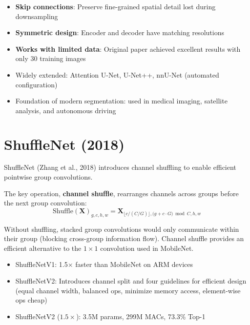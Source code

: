 \begin{properties}
\begin{itemize}
    \item \textbf{Skip connections}: Preserve fine-grained spatial detail lost during downsampling
    \item \textbf{Symmetric design}: Encoder and decoder have matching resolutions
    \item \textbf{Works with limited data}: Original paper achieved excellent results with only 30 training images
    \item Widely extended: Attention U-Net, U-Net++, nnU-Net (automated configuration)
    \item Foundation of modern segmentation: used in medical imaging, satellite analysis, and autonomous driving
\end{itemize}
\end{properties}

\section{ShuffleNet (2018)}

ShuffleNet (Zhang et al., 2018) introduces channel shuffling to enable efficient pointwise group convolutions.

The key operation, \textbf{channel shuffle}, rearranges channels across groups before the next group convolution:
\begin{equation}
\text{Shuffle}(\mathbf{X})_{g, c, h, w} = \mathbf{X}_{\lfloor c / (C/G) \rfloor, \bigl(g + c \cdot G \bigr) \bmod C, h, w}
\end{equation}

Without shuffling, stacked group convolutions would only communicate within their group (blocking cross-group information flow). Channel shuffle provides an efficient alternative to the $1 \times 1$ convolution used in MobileNet.

\begin{properties}
\begin{itemize}
    \item ShuffleNetV1: 1.5$\times$ faster than MobileNet on ARM devices
    \item ShuffleNetV2: Introduces channel split and four guidelines for efficient design (equal channel width, balanced ops, minimize memory access, element-wise ops cheap)
    \item ShuffleNetV2 ($1.5\times$): 3.5M params, 299M MACs, 73.3\% Top-1
\end{itemize}
\end{properties}

